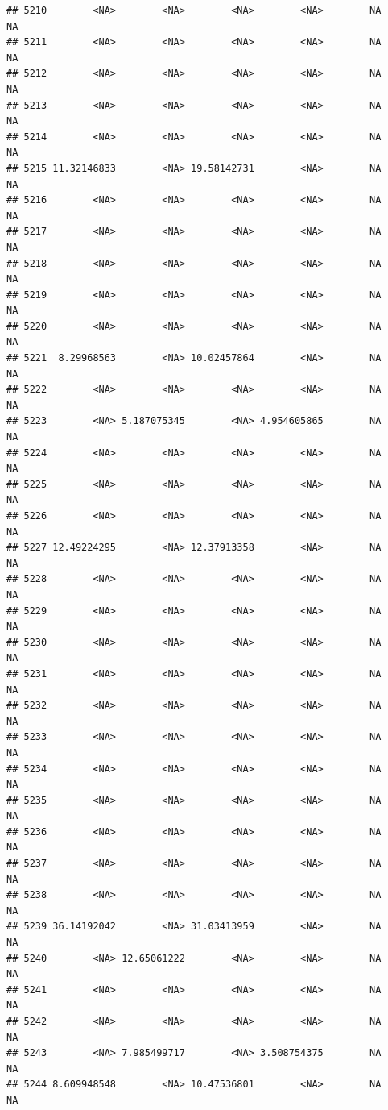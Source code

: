 \documentclass[12pt, a4paper]{article}\usepackage[]{graphicx}\usepackage[]{color}
\makeatletter
\newenvironment{kframe}{%
 \def\at@end@of@kframe{}%
 \ifinner\ifhmode%
  \def\at@end@of@kframe{\end{minipage}}%
  \begin{minipage}{\columnwidth}%
 \fi\fi%
 \def\FrameCommand##1{\hskip\@totalleftmargin \hskip-\fboxsep
 \colorbox{shadecolor}{##1}\hskip-\fboxsep
     \hskip-\linewidth \hskip-\@totalleftmargin \hskip\columnwidth}%
 \MakeFramed {\advance\hsize-\width
   \@totalleftmargin\z@ \linewidth\hsize
   \@setminipage}}%
 {\par\unskip\endMakeFramed%
 \at@end@of@kframe}
\newenvironment{knitrout}{}{} %
\makeatother
\begin{document}
\begin{knitrout}
\begin{kframe}
\begin{verbatim}
## 5210        <NA>        <NA>        <NA>        <NA>        NA        NA
## 5211        <NA>        <NA>        <NA>        <NA>        NA        NA
## 5212        <NA>        <NA>        <NA>        <NA>        NA        NA
## 5213        <NA>        <NA>        <NA>        <NA>        NA        NA
## 5214        <NA>        <NA>        <NA>        <NA>        NA        NA
## 5215 11.32146833        <NA> 19.58142731        <NA>        NA        NA
## 5216        <NA>        <NA>        <NA>        <NA>        NA        NA
## 5217        <NA>        <NA>        <NA>        <NA>        NA        NA
## 5218        <NA>        <NA>        <NA>        <NA>        NA        NA
## 5219        <NA>        <NA>        <NA>        <NA>        NA        NA
## 5220        <NA>        <NA>        <NA>        <NA>        NA        NA
## 5221  8.29968563        <NA> 10.02457864        <NA>        NA        NA
## 5222        <NA>        <NA>        <NA>        <NA>        NA        NA
## 5223        <NA> 5.187075345        <NA> 4.954605865        NA        NA
## 5224        <NA>        <NA>        <NA>        <NA>        NA        NA
## 5225        <NA>        <NA>        <NA>        <NA>        NA        NA
## 5226        <NA>        <NA>        <NA>        <NA>        NA        NA
## 5227 12.49224295        <NA> 12.37913358        <NA>        NA        NA
## 5228        <NA>        <NA>        <NA>        <NA>        NA        NA
## 5229        <NA>        <NA>        <NA>        <NA>        NA        NA
## 5230        <NA>        <NA>        <NA>        <NA>        NA        NA
## 5231        <NA>        <NA>        <NA>        <NA>        NA        NA
## 5232        <NA>        <NA>        <NA>        <NA>        NA        NA
## 5233        <NA>        <NA>        <NA>        <NA>        NA        NA
## 5234        <NA>        <NA>        <NA>        <NA>        NA        NA
## 5235        <NA>        <NA>        <NA>        <NA>        NA        NA
## 5236        <NA>        <NA>        <NA>        <NA>        NA        NA
## 5237        <NA>        <NA>        <NA>        <NA>        NA        NA
## 5238        <NA>        <NA>        <NA>        <NA>        NA        NA
## 5239 36.14192042        <NA> 31.03413959        <NA>        NA        NA
## 5240        <NA> 12.65061222        <NA>        <NA>        NA        NA
## 5241        <NA>        <NA>        <NA>        <NA>        NA        NA
## 5242        <NA>        <NA>        <NA>        <NA>        NA        NA
## 5243        <NA> 7.985499717        <NA> 3.508754375        NA        NA
## 5244 8.609948548        <NA> 10.47536801        <NA>        NA        NA

\end{verbatim}
\end{kframe}
\end{knitrout}
\end{document}
